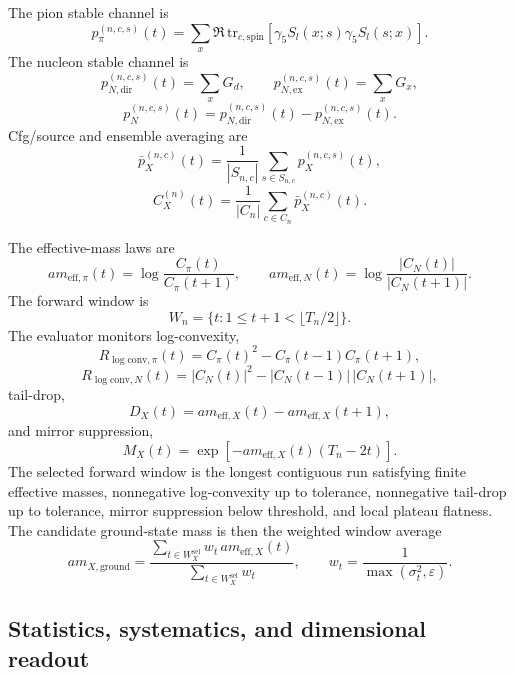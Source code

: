 \documentclass[11pt]{article}
\begin{document}
The pion stable channel is
\[
p_\pi^{(n,c,s)}(t)
=
\sum_x \Re\,\mathrm{tr}_{c,\mathrm{spin}}
\left[
\gamma_5 S_l(x;s)\gamma_5 S_l(s;x)
\right].
\]
The nucleon stable channel is
\[
p_{N,\mathrm{dir}}^{(n,c,s)}(t) = \sum_x G_d,
\qquad
p_{N,\mathrm{ex}}^{(n,c,s)}(t) = \sum_x G_x,
\]
\[
p_N^{(n,c,s)}(t)
=
p_{N,\mathrm{dir}}^{(n,c,s)}(t) - p_{N,\mathrm{ex}}^{(n,c,s)}(t).
\]
Cfg/source and ensemble averaging are
\[
\bar p_X^{(n,c)}(t)
=
\frac{1}{|S_{n,c}|}\sum_{s\in S_{n,c}} p_X^{(n,c,s)}(t),
\]
\[
C_X^{(n)}(t)
=
\frac{1}{|C_n|}\sum_{c\in C_n} \bar p_X^{(n,c)}(t).
\]

The effective-mass laws are
\[
a m_{\mathrm{eff},\pi}(t)
=
\log\!\frac{C_\pi(t)}{C_\pi(t+1)},
\qquad
a m_{\mathrm{eff},N}(t)
=
\log\!\frac{|C_N(t)|}{|C_N(t+1)|}.
\]
The forward window is
\[
W_n = \{ t : 1 \le t+1 < \lfloor T_n/2 \rfloor \}.
\]
The evaluator monitors log-convexity,
\[
R_{\log\mathrm{conv},\pi}(t)
=
C_\pi(t)^2 - C_\pi(t-1)C_\pi(t+1),
\]
\[
R_{\log\mathrm{conv},N}(t)
=
|C_N(t)|^2 - |C_N(t-1)|\,|C_N(t+1)|,
\]
tail-drop,
\[
D_X(t)
=
a m_{\mathrm{eff},X}(t) - a m_{\mathrm{eff},X}(t+1),
\]
and mirror suppression,
\[
M_X(t)
=
\exp[-a m_{\mathrm{eff},X}(t)(T_n - 2t)].
\]
The selected forward window is the longest contiguous run satisfying finite effective masses,
nonnegative log-convexity up to tolerance, nonnegative tail-drop up to tolerance, mirror
suppression below threshold, and local plateau flatness. The candidate ground-state mass is then
the weighted window average
\[
a m_{X,\mathrm{ground}}
=
\frac{\sum_{t\in W_X^{\mathrm{sel}}} w_t\,a m_{\mathrm{eff},X}(t)}
{\sum_{t\in W_X^{\mathrm{sel}}} w_t},
\qquad
w_t = \frac{1}{\max(\sigma_t^2,\varepsilon)}.
\]

\subsection{Statistics, systematics, and dimensional readout}
\end{document}
